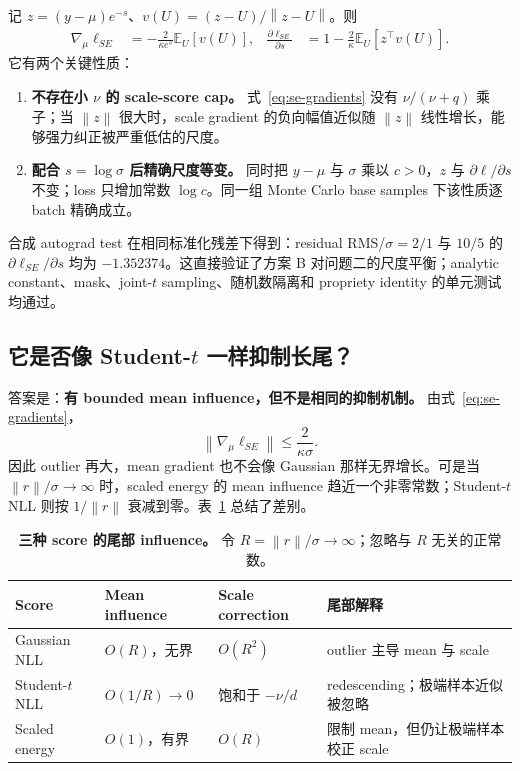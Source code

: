 \documentclass[10pt]{article}
\newcommand{\E}{\mathbb{E}}
\newcommand{\norm}[1]{\left\lVert#1\right\rVert}
\begin{document}
记 $z=(y-\mu)e^{-s}$、$v(U)=(z-U)/\norm{z-U}$。则
\begin{align}
 \nabla_\mu\ell_{SE}
 &=-\frac{2}{\kappa e^s}\E_U[v(U)],
 &
 \frac{\partial\ell_{SE}}{\partial s}
 &=1-\frac{2}{\kappa}\E_U[z^\top v(U)].
 \label{eq:se-gradients}
\end{align}
它有两个关键性质：
\begin{enumerate}
 \item \textbf{不存在小 $\nu$ 的 scale-score cap。} 式~\eqref{eq:se-gradients} 没有 $\nu/(\nu+q)$ 乘子；当 $\norm{z}$ 很大时，scale gradient 的负向幅值近似随 $\norm{z}$ 线性增长，能够强力纠正被严重低估的尺度。
 \item \textbf{配合 $s=\log\sigma$ 后精确尺度等变。} 同时把 $y-\mu$ 与 $\sigma$ 乘以 $c>0$，$z$ 与 $\partial\ell/\partial s$ 不变；loss 只增加常数 $\log c$。同一组 Monte Carlo base samples 下该性质逐 batch 精确成立。
\end{enumerate}
合成 autograd test 在相同标准化残差下得到：residual RMS/$\sigma=2/1$ 与 $10/5$ 的 $\partial\ell_{SE}/\partial s$ 均为 $-1.352374$。这直接验证了方案 B 对问题二的尺度平衡；analytic constant、mask、joint-$t$ sampling、随机数隔离和 propriety identity 的单元测试均通过。

\subsection{它是否像 Student-$t$ 一样抑制长尾？}

答案是：\textbf{有 bounded mean influence，但不是相同的抑制机制。}
由式~\eqref{eq:se-gradients}，
\begin{equation}
 \norm{\nabla_\mu\ell_{SE}}\le\frac{2}{\kappa\sigma}.
 \label{eq:se-bound}
\end{equation}
因此 outlier 再大，mean gradient 也不会像 Gaussian 那样无界增长。可是当 $\norm{r}/\sigma\rightarrow\infty$ 时，scaled energy 的 mean influence 趋近一个非零常数；Student-$t$ NLL 则按 $1/\norm{r}$ 衰减到零。表~\ref{tab:influence} 总结了差别。

\begin{table}[h]
\centering
\caption{\textbf{三种 score 的尾部 influence。} 令 $R=\norm{r}/\sigma\rightarrow\infty$；忽略与 $R$ 无关的正常数。}
\label{tab:influence}
\small
\begin{tabularx}{0.95\linewidth}{@{}lXXX@{}}
\toprule
Score & Mean influence & Scale correction & 尾部解释 \\
\midrule
Gaussian NLL & $O(R)$，无界 & $O(R^2)$ & outlier 主导 mean 与 scale \\
Student-$t$ NLL & $O(1/R)\to0$ & 饱和于 $-\nu/d$ & redescending；极端样本近似被忽略 \\
Scaled energy & $O(1)$，有界 & $O(R)$ & 限制 mean，但仍让极端样本校正 scale \\
\bottomrule
\end{tabularx}
\end{table}
\end{document}
